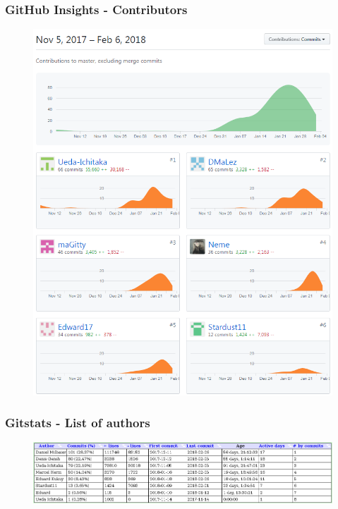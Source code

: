 \documentclass[11pt, usepdftitle=false,...]{beamer}
\begin{document}
			\begin{frame}
				\frametitle{GitHub Insights - Contributors}
				\begin{figure}[ht] 
					\centering
					\includegraphics[scale=0.30, trim= 1cm 0 0 0]{contributors.png}
					\label{fig2}
				\end{figure}
			\end{frame}	
	
			\begin{frame}
				\frametitle{Gitstats - List of authors}
				\begin{figure}[ht] 
					\centering
					\includegraphics[scale=0.45, trim= 1cm 0 0 0]{authors.png}
					\label{fig3}
				\end{figure}
			\end{frame}
			
\end{document}
